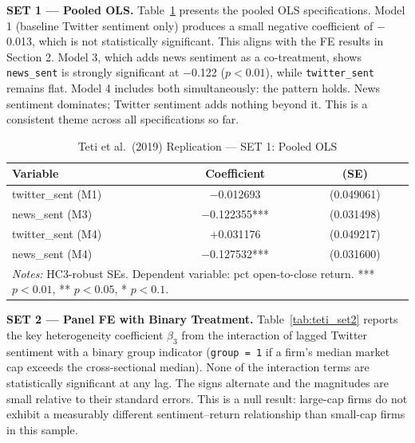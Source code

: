 \documentclass[12pt]{article}
\begin{document}
\textbf{SET 1 --- Pooled OLS.} Table~\ref{tab:teti_set1} presents the pooled OLS specifications. Model 1 (baseline Twitter sentiment only) produces a small negative coefficient of $-$0.013, which is not statistically significant. This aligns with the FE results in Section 2. Model 3, which adds news sentiment as a co-treatment, shows \texttt{news\_sent} is strongly significant at $-$0.122 ($p < 0.01$), while \texttt{twitter\_sent} remains flat. Model 4 includes both simultaneously: the pattern holds. News sentiment dominates; Twitter sentiment adds nothing beyond it. This is a consistent theme across all specifications so far.

\begin{table}[htbp]
\centering
\caption{Teti et al.\ (2019) Replication --- SET 1: Pooled OLS}
\label{tab:teti_set1}
\begin{tabular}{lcc}
\hline\hline
Variable & Coefficient & (SE) \\
\hline
twitter\_sent (M1) & $-$0.012693 & (0.049061) \\
news\_sent (M3) & $-$0.122355*** & (0.031498) \\
twitter\_sent (M4) & $+$0.031176 & (0.049217) \\
news\_sent (M4) & $-$0.127532*** & (0.031600) \\
\hline\hline
\multicolumn{3}{p{0.9\linewidth}}{\footnotesize \textit{Notes:} HC3-robust SEs. Dependent variable: pct open-to-close return. *** $p<0.01$, ** $p<0.05$, * $p<0.1$.}
\end{tabular}
\end{table}

\textbf{SET 2 --- Panel FE with Binary Treatment.} Table~\ref{tab:teti_set2} reports the key heterogeneity coefficient $\beta_3$ from the interaction of lagged Twitter sentiment with a binary group indicator (\texttt{group = 1} if a firm's median market cap exceeds the cross-sectional median). None of the interaction terms are statistically significant at any lag. The signs alternate and the magnitudes are small relative to their standard errors. This is a null result: large-cap firms do not exhibit a measurably different sentiment--return relationship than small-cap firms in this sample.
\end{document}
